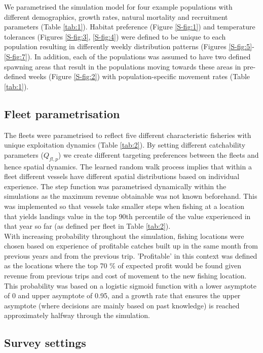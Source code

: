 \documentclass[review]{elsarticle}
\begin{document}
We parametrised the simulation model for four example populations with
different demographics, growth rates, natural mortality and recruitment
parameters (Table \ref{tab:1}). Habitat preference (Figure \ref{S-fig:1}) and
temperature tolerances (Figures \ref{S-fig:3}, \ref{S-fig:4}) were defined to
be unique to each population resulting in differently weekly distribution
patterns (Figures \ref{S-fig:5}-\ref{S-fig:7}). In addition, each of the
populations was assumed to have two defined spawning areas that result in the
populations moving towards these areas in pre-defined weeks (Figure
\ref{S-fig:2}) with population-specific movement rates (Table \ref{tab:1}).

\subsection{Fleet parametrisation}

The fleets were parametrised to reflect five different characteristic fisheries
with unique exploitation dynamics (Table \ref{tab:2}). By setting different
catchability parameters ($Q_{fl, p}$) we create different targeting preferences
between the fleets and hence spatial dynamics.  The learned random walk process
implies that within a fleet different vessels have different spatial
distributions based on individual experience. The step function was
parametrised dynamically within the simulations as the maximum revenue
obtainable was not known beforehand. This was implemented so that vessels take
smaller steps when fishing at a location that yields landings value in the top
90th percentile of the value experienced in that year so far (as defined per
fleet in Table \ref{tab:2}). \\

With increasing probability throughout the simulation, fishing locations were
chosen based on experience of profitable catches built up in the same month
from previous years and from the previous trip. 'Profitable' in this context
was defined as the locations where the top 70 \% of expected profit would be
found given revenue from previous trips and cost of movement to the new fishing
location. This probability was based on a logistic sigmoid function with a
lower asymptote of 0 and upper asymptote of 0.95, and a growth rate that
ensures the upper asymptote (where decisions are mainly based on past
knowledge) is reached approximately halfway through the simulation.  \\


\subsection{Survey settings}
\end{document}
